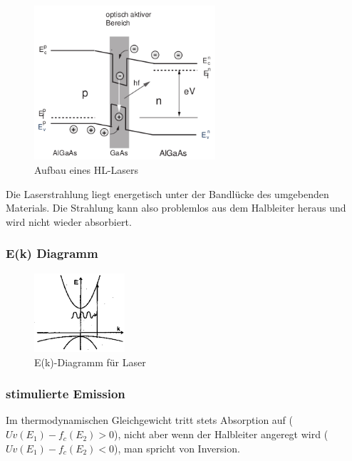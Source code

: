     \begin{figure}[H]
        \centering
        \includegraphics[width=0.6\textwidth]{fig/hlLaser}
        \caption{Aufbau eines HL-Lasers}
        \label{fig:hlLaser}
    \end{figure}
    Die Laserstrahlung liegt energetisch unter der Bandlücke des umgebenden Materials. Die Strahlung kann also problemlos aus dem Halbleiter heraus und wird nicht wieder absorbiert.
    \subsubsection{E(k) Diagramm}
        \begin{figure}[H]
            \centering
            \includegraphics[width=0.3\textwidth]{fig/ekLaser}
            \caption{E(k)-Diagramm f\"ur Laser}
            \label{fig:ekLaser}
        \end{figure}
    \subsubsection{stimulierte Emission}
    Im thermodynamischen Gleichgewicht tritt stets Absorption auf ($Uv(E_1)-f_c(E_2) > 0$), nicht aber wenn der Halbleiter angeregt wird ($Uv(E_1)-f_c(E_2) < 0$), man spricht von Inversion.
